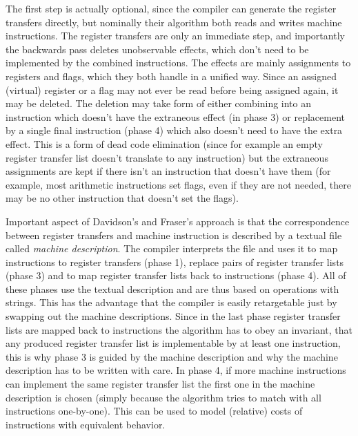 The first step is actually optional, since the compiler can generate the
register transfers directly, but nominally their algorithm both reads and writes
machine instructions. The register transfers are only an immediate step, and
importantly the backwards pass deletes unobservable effects, which don't need to
be implemented by the combined instructions. The effects are mainly assignments
to registers and flags, which they both handle in a unified way. Since an
assigned (virtual) register or a flag may not ever be read before being assigned
again, it may be deleted. The deletion may take form of either combining into an
instruction which doesn't have the extraneous effect (in phase 3) or replacement
by a single final instruction (phase 4) which also doesn't need to have the
extra effect. This is a form of dead code elimination (since for example an
empty register transfer list doesn't translate to any instruction) but the
extraneous assignments are kept if there isn't an instruction that doesn't have
them (for example, most arithmetic instructions set flags, even if they are not
needed, there may be no other instruction that doesn't set the flags).

Important aspect of Davidson's and Fraser's approach is that the correspondence
between register transfers and machine instruction is described by a textual
file called {\em machine description}. The compiler interprets the file and uses
it to map instructions to register transfers (phase 1), replace pairs of
register transfer lists (phase 3) and to map register transfer lists back to
instructions (phase 4). All of these phases use the textual description and are
thus based on operations with strings. This has the advantage that the compiler
is easily retargetable just by swapping out the machine descriptions. Since in
the last phase register transfer lists are mapped back to instructions the
algorithm has to obey an invariant, that any produced register transfer list is
implementable by at least one instruction, this is why phase 3 is guided by the
machine description and why the machine description has to be written with care.
In phase 4, if more machine instructions can implement the same register
transfer list the first one in the machine description is chosen (simply because
the algorithm tries to match with all instructions one-by-one). This can be used
to model (relative) costs of instructions with equivalent behavior.

